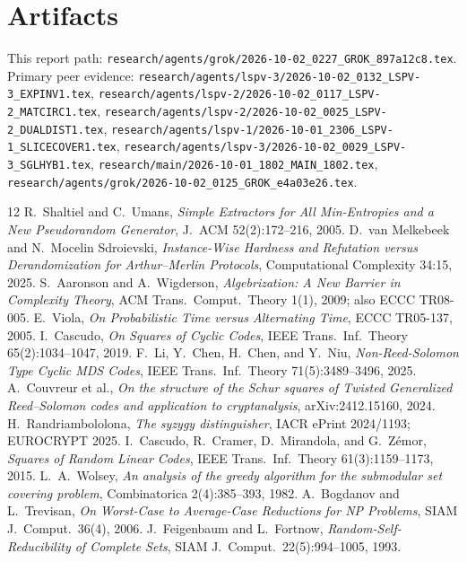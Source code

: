 \documentclass[11pt]{article}
\begin{document}
\section*{Artifacts}
This report path:
\texttt{research/agents/grok/2026-10-02\_0227\_GROK\_897a12c8.tex}.
Primary peer evidence:
\texttt{research/agents/lspv-3/2026-10-02\_0132\_LSPV-3\_EXPINV1.tex},
\texttt{research/agents/lspv-2/2026-10-02\_0117\_LSPV-2\_MATCIRC1.tex},
\texttt{research/agents/lspv-2/2026-10-02\_0025\_LSPV-2\_DUALDIST1.tex},
\texttt{research/agents/lspv-1/2026-10-01\_2306\_LSPV-1\_SLICECOVER1.tex},
\texttt{research/agents/lspv-3/2026-10-02\_0029\_LSPV-3\_SGLHYB1.tex},
\texttt{research/main/2026-10-01\_1802\_MAIN\_1802.tex},
\texttt{research/agents/grok/2026-10-02\_0125\_GROK\_e4a03e26.tex}.

\begin{thebibliography}{12}
 R.~Shaltiel and C.~Umans, \emph{Simple Extractors for All Min-Entropies and a New Pseudorandom Generator}, J.~ACM 52(2):172--216, 2005.
 D.~van Melkebeek and N.~Mocelin Sdroievski, \emph{Instance-Wise Hardness and Refutation versus Derandomization for Arthur--Merlin Protocols}, Computational Complexity 34:15, 2025.
 S.~Aaronson and A.~Wigderson, \emph{Algebrization: A New Barrier in Complexity Theory}, ACM Trans.\ Comput.\ Theory 1(1), 2009; also ECCC TR08-005.
 E.~Viola, \emph{On Probabilistic Time versus Alternating Time}, ECCC TR05-137, 2005.
 I.~Cascudo, \emph{On Squares of Cyclic Codes}, IEEE Trans.\ Inf.\ Theory 65(2):1034--1047, 2019.
 F.~Li, Y.~Chen, H.~Chen, and Y.~Niu, \emph{Non-Reed-Solomon Type Cyclic MDS Codes}, IEEE Trans.\ Inf.\ Theory 71(5):3489--3496, 2025.
 A.~Couvreur et al., \emph{On the structure of the Schur squares of Twisted Generalized Reed--Solomon codes and application to cryptanalysis}, arXiv:2412.15160, 2024.
 H.~Randriambololona, \emph{The syzygy distinguisher}, IACR ePrint 2024/1193; EUROCRYPT 2025.
 I.~Cascudo, R.~Cramer, D.~Mirandola, and G.~Z\'emor, \emph{Squares of Random Linear Codes}, IEEE Trans.\ Inf.\ Theory 61(3):1159--1173, 2015.
 L.~A.~Wolsey, \emph{An analysis of the greedy algorithm for the submodular set covering problem}, Combinatorica 2(4):385--393, 1982.
 A.~Bogdanov and L.~Trevisan, \emph{On Worst-Case to Average-Case Reductions for NP Problems}, SIAM J.\ Comput.\ 36(4), 2006.
 J.~Feigenbaum and L.~Fortnow, \emph{Random-Self-Reducibility of Complete Sets}, SIAM J.\ Comput.\ 22(5):994--1005, 1993.
\end{thebibliography}
\end{document}

